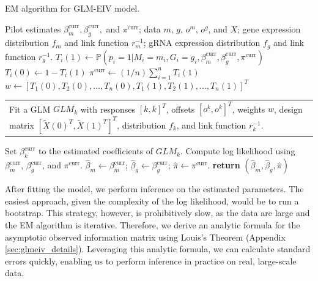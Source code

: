 \documentclass[12pt]{article}
\makeatletter
\newcommand{\multiline}[1]{%
	\begin{tabularx}{\dimexpr\linewidth-\ALG@thistlm}[t]{@{}X@{}}
		#1
	\end{tabularx}
}
\makeatother
\begin{document}
\begin{algorithm}
	\caption{EM algorithm for GLM-EIV model.}\label{algo:em_full}
	\begin{algorithmic}
		\Require Pilot estimates $\beta^\textrm{curr}_m, \beta^\textrm{curr}_g,$ and $\pi^\textrm{curr}$; data $m$, $g$, $o^m$, $o^g$, and $X$; gene expression distribution $f_m$ and link function $r^{-1}_m$; gRNA expression distribution $f_g$ and link function $r^{-1}_g$.  
		 
		\State $T_i(1) \gets \mathbb{P}\left(p_i = 1 |M_i = m_i, G_i = g_i, \beta_m^\textrm{curr}, \beta_g^\textrm{curr}, \pi^\textrm{curr} \right)$
		\State $T_i(0) \gets 1 - T_i(1)$
		\EndFor
		\State $\pi^{\textrm{curr}} \gets (1/n) \sum_{i=1}^n T_i(1)$ 
		\State $w \gets [T_1(0), T_2(0), \dots, T_n(0), T_1(1), T_2(1), \dots, T_n(1)]^T$
		\State  \multiline{ 
			Fit a GLM $GLM_k$ with responses $[k,k]^T$, offsets $[o^k, o^k]^T$, weights $w$, design matrix $[\tilde{X}(0)^T, \tilde{X}(1)^T]^T$, distribution $f_k$, and link function $r^{-1}_k$.
		}
		\State Set $\beta_k^\textrm{curr}$ to the estimated coefficients of $GLM_k$.
		\EndFor
		\State Compute log likelihood using $\beta_m^\textrm{curr}$, $\beta_g^\textrm{curr}$, and $\pi^\textrm{curr}$.
		\EndWhile
		\State $\hat{\beta}_m \gets \beta_m^\textrm{curr}$; $\hat{\beta}_g \gets \beta_g^\textrm{curr}$; $\hat{\pi} \gets \pi^\textrm{curr}$.
		\State \textbf{return} $(\hat{\beta}_m, \hat{\beta}_g, \hat{\pi})$
	\end{algorithmic}
\end{algorithm}

After fitting the model, we perform inference on the estimated parameters. The easiest approach, given the complexity of the log likelihood, would be to run a bootstrap. This strategy, however, is prohibitively slow, as the data are large and the EM algorithm is iterative. Therefore, we derive an analytic formula for the asymptotic observed information matrix using Louis's Theorem \cite{Louis1982} (Appendix \ref{sec:glmeiv_details}). Leveraging this analytic formula, we can calculate standard errors quickly, enabling us to perform inference in practice on real, large-scale data.
\end{document}
